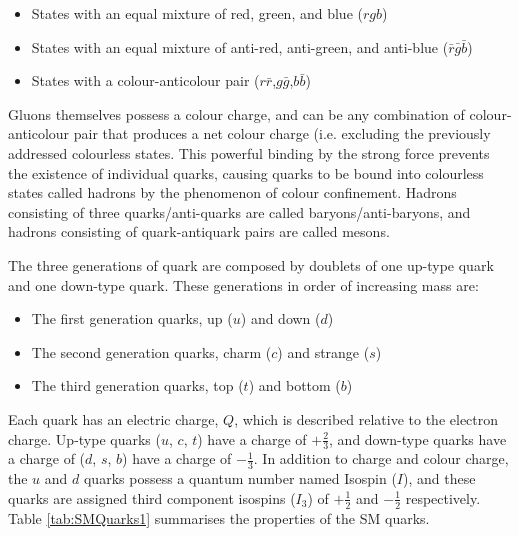 \documentclass[12pt,a4paper,epsf,portrait,times,epsfig]{report}
\begin{document}
	\begin{itemize}
		\item States with an equal mixture of red, green, and blue ($rgb$)
		\item States with an equal mixture of anti-red, anti-green, and anti-blue ($\bar{r}\bar{g}\bar{b}$)
		\item States with a colour-anticolour pair ($r\bar{r}$,$g\bar{g}$,$b\bar{b}$)
	\end{itemize}

	Gluons themselves possess a colour charge, and can be any combination of colour-anticolour pair that produces a net colour charge (i.e. excluding the previously addressed colourless states. This powerful binding by the strong force prevents the existence of individual quarks, causing quarks to be bound into colourless states called hadrons by the phenomenon of colour confinement. Hadrons consisting of three quarks/anti-quarks are called baryons/anti-baryons, and hadrons consisting of quark-antiquark pairs are called mesons. \par

	The three generations of quark are composed by doublets of one up-type quark and one down-type quark. These generations in order of increasing mass are:
	
	\begin{itemize}
		\item The first generation quarks, up ($u$) and down ($d$)
		\item The second generation quarks, charm ($c$) and strange ($s$)
		\item The third generation quarks, top ($t$) and bottom ($b$)
	\end{itemize}
	
	Each quark has an electric charge, $Q$, which is described relative to the electron charge. Up-type quarks ($u$, $c$, $t$) have a charge of $+\frac{2}{3}$, and down-type quarks have a charge of ($d$, $s$, $b$) have a charge of $-\frac{1}{3}$. In addition to charge and colour charge, the $u$ and $d$ quarks possess a quantum number named Isospin ($I$), and these quarks are assigned third component isospins ($I_{3}$) of $+\frac{1}{2}$ and $-\frac{1}{2}$ respectively. Table \ref{tab:SMQuarks1} summarises the properties of the SM quarks.

\end{document}
